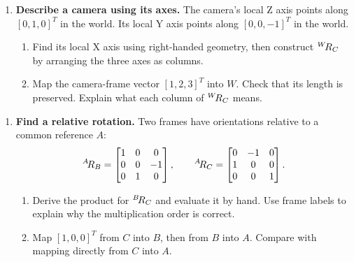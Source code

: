 \begin{enumerate}
\item \textbf{Describe a camera using its axes.}
The camera's local Z axis points along $[0,1,0]^T$ in the world. Its local Y
axis points along $[0,0,-1]^T$ in the world.
\begin{enumerate}
\item Find its local X axis using right-handed geometry, then construct
${}^{W}\!R_{C}$ by arranging the three axes as columns.
\item Map the camera-frame vector $[1,2,3]^T$ into $W$. Check that its
length is preserved. Explain what each column of ${}^{W}\!R_{C}$ means.
\end{enumerate}
\end{enumerate}

\newpage
\begin{enumerate}[start=4]
\item \textbf{Find a relative rotation.}
Two frames have orientations relative to a common reference $A$:
\[
{}^{A}\!R_{B}=\begin{bmatrix}1&0&0\\0&0&-1\\0&1&0\end{bmatrix},\qquad
{}^{A}\!R_{C}=\begin{bmatrix}0&-1&0\\1&0&0\\0&0&1\end{bmatrix}.
\]
\begin{enumerate}
\item Derive the product for ${}^{B}\!R_{C}$ and evaluate it by hand.
Use frame labels to explain why the multiplication order is correct.
\item Map $[1,0,0]^T$ from $C$ into $B$, then from $B$ into $A$.
Compare with mapping directly from $C$ into $A$.
\end{enumerate}


\end{enumerate}
